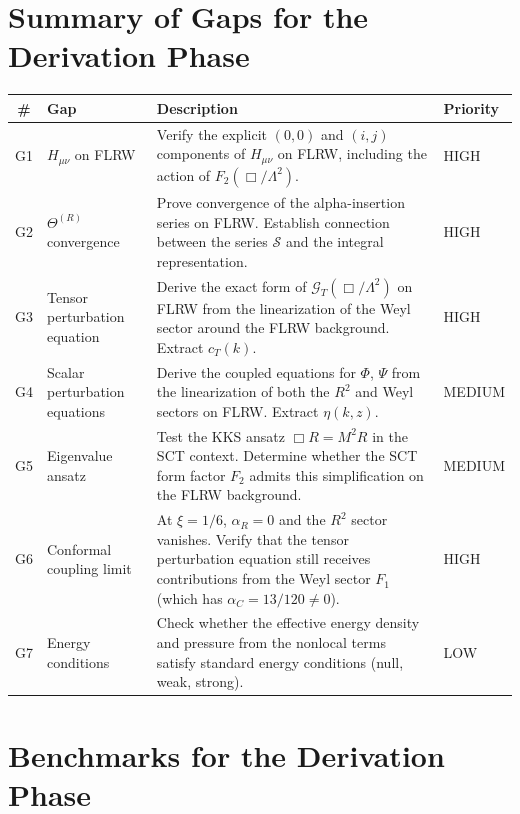 \documentclass[12pt,a4paper]{article}
\theoremstyle{definition}
\theoremstyle{remark}
\begin{document}
\section{Summary of Gaps for the Derivation Phase}\label{sec:gaps}

\begin{center}
\begin{tabular}{clp{8cm}l}
\toprule
\textbf{\#} & \textbf{Gap} & \textbf{Description} & \textbf{Priority} \\
\midrule
G1 & $H_{\mu\nu}$ on FLRW &
  Verify the explicit $(0,0)$ and $(i,j)$ components of $H_{\mu\nu}$
  on FLRW, including the action of $F_2(\Box/\Lambda^2)$.
  & HIGH \\
G2 & $\Theta^{(R)}$ convergence &
  Prove convergence of the alpha-insertion series on FLRW.
  Establish connection between the series $\mathcal{S}$ and the
  integral representation.
  & HIGH \\
G3 & Tensor perturbation equation &
  Derive the exact form of $\mathcal{G}_T(\Box/\Lambda^2)$ on FLRW
  from the linearization of the Weyl sector around the FLRW
  background. Extract $c_T(k)$.
  & HIGH \\
G4 & Scalar perturbation equations &
  Derive the coupled equations for $\Phi$, $\Psi$ from the
  linearization of both the $R^2$ and Weyl sectors on FLRW.
  Extract $\eta(k, z)$.
  & MEDIUM \\
G5 & Eigenvalue ansatz &
  Test the KKS ansatz $\Box R = M^2 R$ in the SCT context.
  Determine whether the SCT form factor $F_2$ admits this
  simplification on the FLRW background.
  & MEDIUM \\
G6 & Conformal coupling limit &
  At $\xi = 1/6$, $\alpha_R = 0$ and the $R^2$ sector vanishes.
  Verify that the tensor perturbation equation still receives
  contributions from the Weyl sector $F_1$ (which has $\alpha_C =
  13/120 \neq 0$).
  & HIGH \\
G7 & Energy conditions &
  Check whether the effective energy density and pressure from
  the nonlocal terms satisfy standard energy conditions (null,
  weak, strong).
  & LOW \\
\bottomrule
\end{tabular}
\end{center}

\section{Benchmarks for the Derivation Phase}\label{sec:benchmarks}
\end{document}
